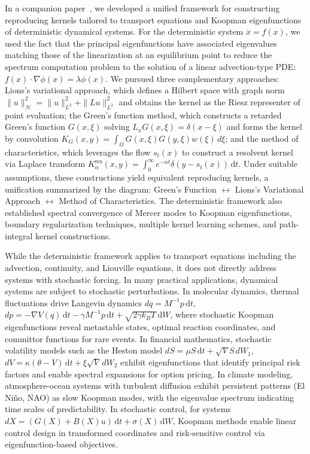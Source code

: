 \documentclass[11pt,a4paper]{article}
\newcommand{\dt}{\,\mathrm{d}t}
\newcommand{\dW}{\,\mathrm{d}W}
\begin{document}
In a companion paper~\cite{HamziOwhadiVaidya2024}, we developed a unified framework for constructing reproducing kernels tailored to transport equations and Koopman eigenfunctions of deterministic dynamical systems. For the deterministic system $\dot{x} = f(x)$, we used the fact that the principal eigenfunctions have associated eigenvalues matching those of the linearization at an equilibrium point to reduce the spectrum computation problem to the solution of a linear advection-type PDE: $f(x) \cdot \nabla\phi(x) = \lambda\phi(x)$. We pursued three complementary approaches: Lions's variational approach, which defines a Hilbert space with graph norm $\|u\|_{\mathcal{H}}^2 = \|u\|_{L^2}^2 + \|Lu\|_{L^2}^2$ and obtains the kernel as the Riesz representer of point evaluation; the Green's function method, which constructs a retarded Green's function $G(x,\xi)$ solving $L_x G(x,\xi) = \delta(x-\xi)$ and forms the kernel by convolution $K_G(x,y) = \int_\Omega G(x,\xi)G(y,\xi)w(\xi)\,d\xi$; and the method of characteristics, which leverages the flow $s_t(x)$ to construct a resolvent kernel via Laplace transform $K_\alpha^{\mathrm{res}}(x,y) = \int_0^\infty e^{-\alpha t} \delta(y - s_t(x))\dt$. Under suitable assumptions, these constructions yield equivalent reproducing kernels, a unification summarized by the diagram: Green's Function $\longleftrightarrow$ Lions's Variational Approach $\longleftrightarrow$ Method of Characteristics. The deterministic framework also established spectral convergence of Mercer modes to Koopman eigenfunctions, boundary regularization techniques, multiple kernel learning schemes, and path-integral kernel constructions.

While the deterministic framework applies to transport equations including the advection, continuity, and Liouville equations, it does not directly address systems with stochastic forcing. In many practical applications, dynamical systems are subject to stochastic perturbations. In molecular dynamics, thermal fluctuations drive Langevin dynamics $dq = M^{-1}p \dt$, $dp = -\nabla V(q) \dt - \gamma M^{-1}p \dt + \sqrt{2\gamma k_B T} \dW$, where stochastic Koopman eigenfunctions reveal metastable states, optimal reaction coordinates, and committor functions for rare events. In financial mathematics, stochastic volatility models such as the Heston model $dS = \mu S \dt + \sqrt{V} S \, dW_1$, $dV = \kappa(\theta - V) \dt + \xi \sqrt{V} \, dW_2$ exhibit eigenfunctions that identify principal risk factors and enable spectral expansions for option pricing. In climate modeling, atmosphere-ocean systems with turbulent diffusion exhibit persistent patterns (El Ni\~{n}o, NAO) as slow Koopman modes, with the eigenvalue spectrum indicating time scales of predictability. In stochastic control, for systems $dX = (G(X) + B(X)u) \dt + \sigma(X) \dW$, Koopman methods enable linear control design in transformed coordinates and risk-sensitive control via eigenfunction-based objectives.
\end{document}
